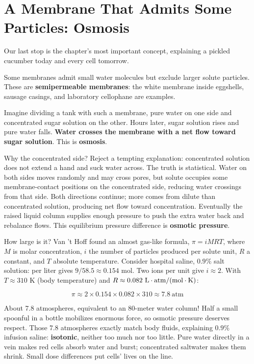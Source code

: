 \section{A Membrane That Admits Some Particles: Osmosis}

Our last stop is the chapter's most important concept, explaining a pickled cucumber today and every cell tomorrow.

Some membranes admit small water molecules but exclude larger solute particles. These are \textbf{semipermeable membranes}: the white membrane inside eggshells, sausage casings, and laboratory cellophane are examples.

Imagine dividing a tank with such a membrane, pure water on one side and concentrated sugar solution on the other. Hours later, sugar solution rises and pure water falls. \textbf{Water crosses the membrane with a net flow toward sugar solution}. This is \textbf{osmosis}.

Why the concentrated side? Reject a tempting explanation: concentrated solution does not extend a hand and suck water across. The truth is statistical. Water on both sides moves randomly and may cross pores, but solute occupies some membrane-contact positions on the concentrated side, reducing water crossings from that side. Both directions continue; more comes from dilute than concentrated solution, producing net flow toward concentration. Eventually the raised liquid column supplies enough pressure to push the extra water back and rebalance flows. This equilibrium pressure difference is \textbf{osmotic pressure}.

\begin{qiaoliang}
How large is it? Van 't Hoff found an almost gas-like formula, $\pi = iMRT$, where $M$ is molar concentration, $i$ the number of particles produced per solute unit, $R$ a constant, and $T$ absolute temperature. Consider hospital saline, $0.9\%$ salt solution:  per liter gives $9/58.5\approx 0.154$ mol. Two ions per unit give $i\approx 2$. With $T\approx 310$ K (body temperature) and $R\approx 0.082\ \mathrm{L\cdot atm/(mol\cdot K)}$:

\[\pi \approx 2\times 0.154\times 0.082\times 310 \approx 7.8\ \mathrm{atm}\]

About 7.8 atmospheres, equivalent to an 80-meter water column! Half a small spoonful in a bottle mobilizes enormous force, so osmotic pressure deserves respect. Those 7.8 atmospheres exactly match body fluids, explaining $0.9\%$ infusion saline: \textbf{isotonic}, neither too much nor too little. Pure water directly in a vein makes red cells absorb water and burst; concentrated saltwater makes them shrink. Small dose differences put cells' lives on the line.
\end{qiaoliang}

